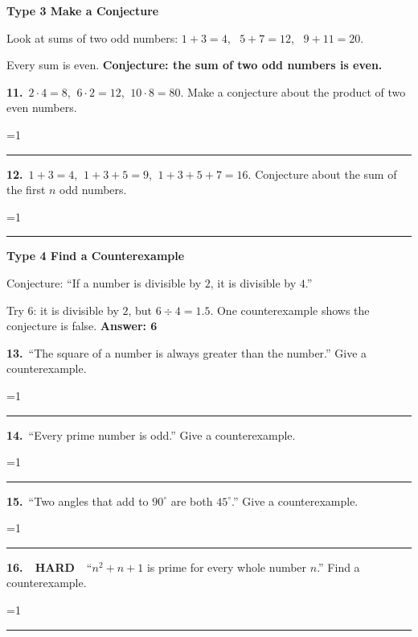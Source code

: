 \documentclass[11pt,letterpaper]{article}
\newcommand{\leveltag}[2]{\colorbox{#1}{\color{white}\bfseries\scriptsize\ #2\ }}
\newcommand{\LH}{\leveltag{fmmistake}{HARD}}
\newcommand{\topicbar}[1]{\needspace{4.5cm}\par\vspace{5mm}
  \begin{tcolorbox}[enhanced,colback=fmtitle,colframe=fmtitle,arc=2mm,left=4mm,top=1.5mm,bottom=1.5mm]
  \color{white}\bfseries\large #1
  \end{tcolorbox}}
\providecommand{\iskey}{0}
\newcommand{\pans}[2][3.2cm]{\ifnum\iskey=1 \underline{\makebox[#1][c]{\color{fmmistake}\bfseries #2}}\else\rule{#1}{0.4pt}\fi}
\newcommand{\sdp}[3]{\begin{minipage}[t][2.4cm]{0.48\linewidth}{\color{fmturn}\bfseries #1.}\ #2\par\vfill\hfill \pans[3.6cm]{#3}\end{minipage}}
\newlength{\pw}
\renewcommand{\pans}[2][3.2cm]{\ifnum\iskey=1 \settowidth{\pw}{\bfseries #2}\ifdim\pw>#1 \parbox[b]{#1}{\raggedleft\color{fmmistake}\bfseries\small #2}\else\underline{\makebox[#1][c]{\color{fmmistake}\bfseries #2}}\fi\else\rule{#1}{0.4pt}\fi}
\begin{document}
\needspace{6cm}\topicbar{Type 3 \quad Make a Conjecture}
\begin{watchme}Look at sums of two odd numbers: $1 + 3 = 4$, \ $5 + 7 = 12$, \ $9 + 11 = 20$.\par
Every sum is even. \quad \textbf{Conjecture: the sum of two odd numbers is even.}\end{watchme}
\needspace{3.4cm}\noindent\sdp{11}{$2 \cdot 4 = 8$, $\ 6 \cdot 2 = 12$, $\ 10 \cdot 8 = 80$. Make a conjecture about the product of two even numbers.}{the product is even}\hfill\sdp{12}{$1 + 3 = 4$, $\ 1 + 3 + 5 = 9$, $\ 1 + 3 + 5 + 7 = 16$. Conjecture about the sum of the first $n$ odd numbers.}{it equals $n^2$}\par

\needspace{6cm}\topicbar{Type 4 \quad Find a Counterexample}
\begin{watchme}Conjecture: ``If a number is divisible by $2$, it is divisible by $4$.''\par
Try $6$: it is divisible by $2$, but $6 \div 4 = 1.5$. One counterexample shows the conjecture is false. \quad \textbf{Answer: $\boldsymbol{6}$}\end{watchme}
\needspace{3.4cm}\noindent\sdp{13}{``The square of a number is always greater than the number.'' Give a counterexample.}{$\tfrac12$ (or $1$, $0$)}\hfill\sdp{14}{``Every prime number is odd.'' Give a counterexample.}{$2$}\par\vspace{2mm}
\needspace{3.4cm}\noindent\sdp{15}{``Two angles that add to $90^\circ$ are both $45^\circ$.'' Give a counterexample.}{$30^\circ$ and $60^\circ$}\hfill\sdp{16}{\LH\ ``$n^2 + n + 1$ is prime for every whole number $n$.'' Find a counterexample.}{$n = 4$: $21 = 3 \cdot 7$}\par
\end{document}
